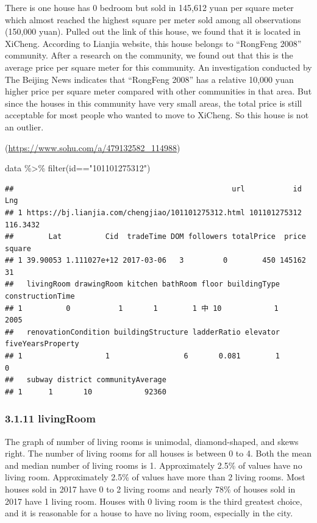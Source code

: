 \documentclass[
]{article}
\newenvironment{Shaded}{\begin{snugshade}}{\end{snugshade}}
\newcommand{\FunctionTok}[1]{\textcolor[rgb]{0.00,0.00,0.00}{#1}}
\newcommand{\NormalTok}[1]{#1}
\newcommand{\SpecialCharTok}[1]{\textcolor[rgb]{0.00,0.00,0.00}{#1}}
\newcommand{\StringTok}[1]{\textcolor[rgb]{0.31,0.60,0.02}{#1}}
\begin{document}
There is one house has 0 bedroom but sold in 145,612 yuan per square
meter which almost reached the highest square per meter sold among all
observations (150,000 yuan). Pulled out the link of this house, we found
that it is located in XiCheng. According to Lianjia website, this house
belongs to ``RongFeng 2008'' community. After a research on the
community, we found out that this is the average price per square meter
for this community. An investigation conducted by The Beijing News
indicates that ``RongFeng 2008'' has a relative 10,000 yuan higher price
per square meter compared with other communities in that area. But since
the houses in this community have very small areas, the total price is
still acceptable for most people who wanted to move to XiCheng. So this
house is not an outlier.

(\url{https://www.sohu.com/a/479132582_114988})

\begin{Shaded}
\begin{Highlighting}[]
\NormalTok{data }\SpecialCharTok{\%\textgreater{}\%}
  \FunctionTok{filter}\NormalTok{(id}\SpecialCharTok{==}\StringTok{"101101275312"}\NormalTok{)}
\end{Highlighting}
\end{Shaded}

\begin{verbatim}
##                                                  url           id      Lng
## 1 https://bj.lianjia.com/chengjiao/101101275312.html 101101275312 116.3432
##        Lat          Cid  tradeTime DOM followers totalPrice  price square
## 1 39.90053 1.111027e+12 2017-03-06   3         0        450 145162     31
##   livingRoom drawingRoom kitchen bathRoom floor buildingType constructionTime
## 1          0           1       1        1 中 10            1             2005
##   renovationCondition buildingStructure ladderRatio elevator fiveYearsProperty
## 1                   1                 6       0.081        1                 0
##   subway district communityAverage
## 1      1       10            92360
\end{verbatim}

\hypertarget{livingroom}{%
\subsubsection{3.1.11 livingRoom}\label{livingroom}}

The graph of number of living rooms is unimodal, diamond-shaped, and
skews right. The number of living rooms for all houses is between 0 to
4. Both the mean and median number of living rooms is 1. Approximately
2.5\% of values have no living room. Approximately 2.5\% of values have
more than 2 living rooms. Most houses sold in 2017 have 0 to 2 living
rooms and nearly 78\% of houses sold in 2017 have 1 living room. Houses
with 0 living room is the third greatest choice, and it is reasonable
for a house to have no living room, especially in the city.
\end{document}
